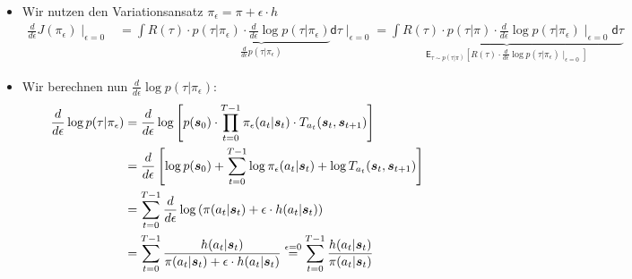 \documentclass[a4paper, 12pt]{scrartcl}
\begin{document}
\begin{beweis}
    \begin{itemize}
        \item Wir nutzen den Variationsansatz $\pi_\epsilon = \pi + \epsilon \cdot h$
        \begin{align*}
            \frac{d}{d \epsilon} J(\pi_\epsilon) \mid_{\epsilon=0}
            &=
            \int R(\tau) \cdot
            \underbrace{
                p(\tau|\pi_\epsilon) \cdot \frac{d}{d \epsilon} \log p(\tau|\pi_\epsilon)
            }_{
                \frac{d}{d \epsilon} p(\tau|\pi_\epsilon)
            } \mathsf{d}\tau
            \mid_{\epsilon=0} 
            =
            \underbrace{
                \int R(\tau) \cdot p(\tau|\pi) \cdot
                \frac{d}{d \epsilon} \log p(\tau|\pi_\epsilon)
                \mid_{\epsilon=0} \mathsf{d}\tau
            }_{
                \mathsf{E}_{\tau \sim p(\tau|\pi)}
                \left[
                    R(\tau) \cdot 
                    \frac{d}{d \epsilon} \log p(\tau|\pi_\epsilon)
                    \mid_{\epsilon=0}
                \right]
            }
        \end{align*}

        \item Wir berechnen nun $\frac{d}{d \epsilon} \log p(\tau|\pi_\epsilon)$:
        \begin{align*}
            \frac{d}{d \epsilon} \log p(\tau|\pi_\epsilon)
            &=
            \frac{d}{d \epsilon} \log
            \left[
                p(\bm{s}_0) \cdot 
                \prod_{t=0}^{T-1} \pi_\epsilon(a_t|\bm{s}_t) 
                \cdot T_{a_t}(\bm{s}_t, \bm{s}_{t+1})
            \right] \\
            &=
            \frac{d}{d \epsilon}
            \left[
                \log p(\bm{s}_0) + 
                \sum_{t=0}^{T-1} 
                \log \pi_\epsilon(a_t|\bm{s}_t) +
                \log T_{a_t}(\bm{s}_t, \bm{s}_{t+1})
            \right] \\
            &=
            \sum_{t=0}^{T-1} 
            \frac{d}{d \epsilon} \log 
            \left( 
                \vphantom{int}
                \pi(a_t|\bm{s}_t) + \epsilon \cdot h(a_t|\bm{s}_t)
            \right) 
            \\
            &=
            \sum_{t=0}^{T-1} 
            \frac{h(a_t|\bm{s}_t)}{\pi(a_t|\bm{s}_t) + \epsilon \cdot h(a_t|\bm{s}_t)} 
            \overset{\epsilon = 0}{=}
            \sum_{t=0}^{T-1} 
            \frac{h(a_t|\bm{s}_t)}{\pi(a_t|\bm{s}_t)} 
        \end{align*}


\end{itemize}
\end{beweis}
\end{document}
